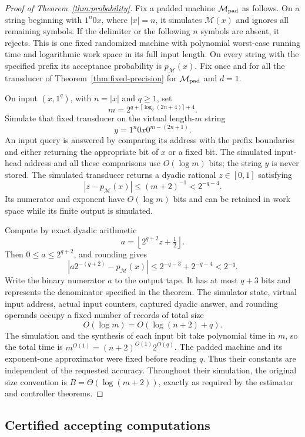 \begin{proof}[Proof of Theorem~\ref{thm:probability}]
Fix a padded machine $\mathcal M_{\rm pad}$ as follows. On a string
beginning with $1^n0x$, where $|x|=n$, it simulates $\mathcal M(x)$
and ignores all remaining symbols. If the delimiter or the following
$n$ symbols are absent, it rejects. This is one fixed randomized
machine with polynomial worst-case running time and logarithmic work
space in its full input length. On every string with the specified
prefix its acceptance probability is $p_{\mathcal M}(x)$.
Fix once and for all the transducer of
Theorem~\ref{thm:fixed-precision} for $\mathcal M_{\rm pad}$ and $d=1$.

On input $(x,1^q)$, with $n=|x|$ and $q\ge1$, set
\[
 m=2^{q+\lceil\log_2(2n+4)\rceil+4}.
\]
Simulate that fixed transducer on the virtual length-$m$ string
\[
 y=1^n0x0^{m-(2n+1)}.
\]
An input query is answered by comparing its address with the prefix
boundaries and either returning the appropriate bit of $x$ or a
fixed bit. The simulated input-head address and all these comparisons
use $O(\log m)$ bits; the string $y$ is never stored. The simulated
transducer returns a dyadic rational $z\in[0,1]$ satisfying
\[
 |z-p_{\mathcal M}(x)|\le(m+2)^{-1}<2^{-q-4}.
\]
Its numerator and exponent have $O(\log m)$ bits and can be retained
in work space while its finite output is simulated.

Compute by exact dyadic arithmetic
\[
 a=\left\lfloor 2^{q+2}z+\tfrac12\right\rfloor.
\]
Then $0\le a\le2^{q+2}$, and rounding gives
\[
 \left|a2^{-(q+2)}-p_{\mathcal M}(x)\right|
 \le2^{-q-3}+2^{-q-4}<2^{-q}.
\]
Write the binary numerator $a$ to the output tape. It has at most
$q+3$ bits and represents the denominator specified in the theorem.
The simulator state, virtual input address, actual input counters,
captured dyadic answer, and rounding operands occupy a fixed number
of records of total size
\[
 O(\log m)=O(\log(n+2)+q).
\]
The simulation and the synthesis of each input bit take polynomial
time in $m$, so the total time is
$m^{O(1)}=(n+2)^{O(1)}2^{O(q)}$.
The padded machine and its exponent-one approximator were fixed
before reading $q$. Thus their constants are independent of the
requested accuracy. Throughout their simulation, the original size
convention is $B=\Theta(\log(m+2))$, exactly as required by the
estimator and controller theorems.
\end{proof}

\subsection{Certified accepting computations}

